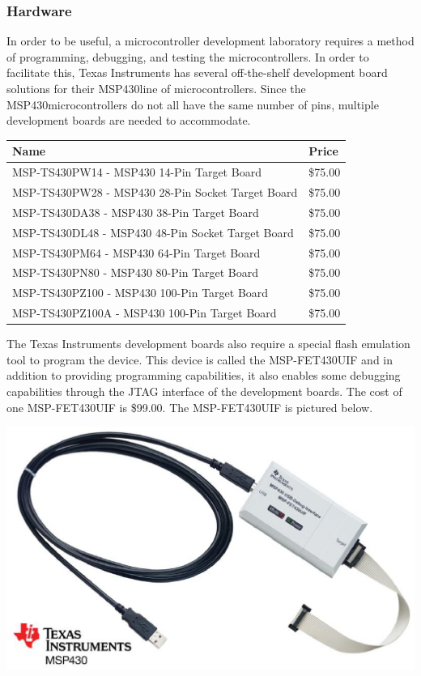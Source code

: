 \documentclass[12pt]{article}
\begin{document}
\subsubsection{Hardware}
In order to be useful, a microcontroller development laboratory requires a method of programming, debugging, and testing the microcontrollers. In order to facilitate this, Texas Instruments has several off-the-shelf development board solutions for their MSP430\texttrademark line of microcontrollers. Since the MSP430\texttrademark microcontrollers do not all have the same number of pins, multiple development boards are needed to accommodate.
\begin{center}
  \begin{tabular}{ l | l }
    Name & Price \\
    \hline %
    MSP-TS430PW14 - MSP430 14-Pin Target Board & \$75.00 \\
    MSP-TS430PW28 - MSP430 28-Pin Socket Target Board & \$75.00 \\
    MSP-TS430DA38 - MSP430 38-Pin Target Board & \$75.00 \\
    MSP-TS430DL48 - MSP430 48-Pin Socket Target Board & \$75.00 \\
    MSP-TS430PM64 - MSP430 64-Pin Target Board & \$75.00 \\
    MSP-TS430PN80 - MSP430 80-Pin Target Board & \$75.00 \\
    MSP-TS430PZ100 - MSP430 100-Pin Target Board & \$75.00 \\
    MSP-TS430PZ100A - MSP430 100-Pin Target Board & \$75.00
  \end{tabular}
\end{center}
The Texas Instruments development boards also require a special flash emulation tool to program the device. This device is called the MSP-FET430UIF and in addition to providing programming capabilities, it also enables some debugging capabilities through the JTAG interface of the development boards. The cost of one MSP-FET430UIF is \$99.00. The MSP-FET430UIF is pictured below. \\ %
\begin{center}
  \includegraphics[scale=0.5]{images/fet430uif}
\end{center}
\mbox{}\\
\end{document}
